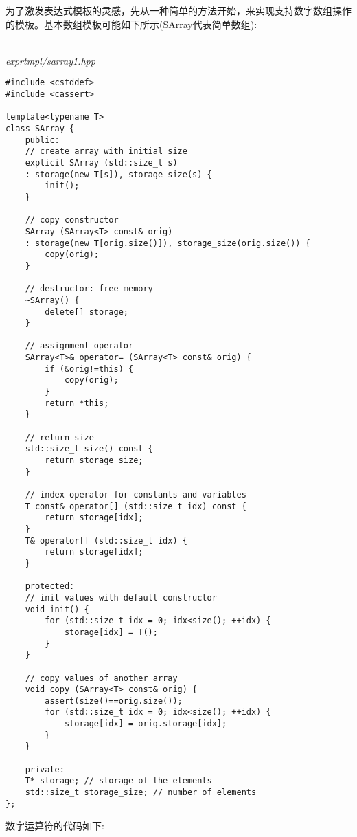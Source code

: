 为了激发表达式模板的灵感，先从一种简单的方法开始，来实现支持数字数组操作的模板。基本数组模板可能如下所示(SArray代表简单数组):

\hspace*{\fill} \\ %
\noindent
\textit{exprtmpl/sarray1.hpp}
\begin{lstlisting}[style=styleCXX]
#include <cstddef>
#include <cassert>

template<typename T>
class SArray {
	public:
	// create array with initial size
	explicit SArray (std::size_t s)
	: storage(new T[s]), storage_size(s) {
		init();
	}

	// copy constructor
	SArray (SArray<T> const& orig)
	: storage(new T[orig.size()]), storage_size(orig.size()) {
		copy(orig);
	}

	// destructor: free memory
	~SArray() {
		delete[] storage;
	}

	// assignment operator
	SArray<T>& operator= (SArray<T> const& orig) {
		if (&orig!=this) {
			copy(orig);
		}
		return *this;
	}

	// return size
	std::size_t size() const {
		return storage_size;
	}

	// index operator for constants and variables
	T const& operator[] (std::size_t idx) const {
		return storage[idx];
	}
	T& operator[] (std::size_t idx) {
		return storage[idx];
	}

	protected:
	// init values with default constructor
	void init() {
		for (std::size_t idx = 0; idx<size(); ++idx) {
			storage[idx] = T();
		}
	}

	// copy values of another array
	void copy (SArray<T> const& orig) {
		assert(size()==orig.size());
		for (std::size_t idx = 0; idx<size(); ++idx) {
			storage[idx] = orig.storage[idx];
		}
	}

	private:
	T* storage; // storage of the elements
	std::size_t storage_size; // number of elements
};
\end{lstlisting}

数字运算符的代码如下:

